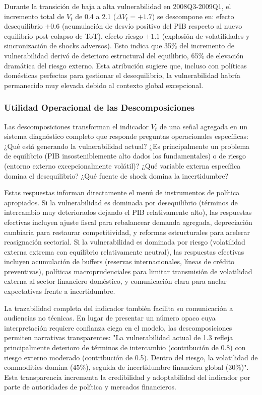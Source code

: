 \documentclass[3p,11pt,draft,natbib=false]{elsarticle}
\begin{document}
Durante la transición de baja a alta vulnerabilidad en 2008Q3-2009Q1, el incremento total de $V_t$ de 0.4 a 2.1 ($\Delta V_t = +1.7$) se descompone en: efecto desequilibrio $+0.6$ (acumulación de desvío positivo del PIB respecto al nuevo equilibrio post-colapso de ToT), efecto riesgo $+1.1$ (explosión de volatilidades y sincronización de shocks adversos). Esto indica que 35\% del incremento de vulnerabilidad derivó de deterioro estructural del equilibrio, 65\% de elevación dramática del riesgo externo. Esta atribución sugiere que, incluso con políticas domésticas perfectas para gestionar el desequilibrio, la vulnerabilidad habría permanecido muy elevada debido al contexto global excepcional.

\subsubsection{Utilidad Operacional de las Descomposiciones}

Las descomposiciones transforman el indicador $V_t$ de una señal agregada en un sistema diagnóstico completo que responde preguntas operacionales específicas: ¿Qué está generando la vulnerabilidad actual? ¿Es principalmente un problema de equilibrio (PIB insosteniblemente alto dados los fundamentales) o de riesgo (entorno externo excepcionalmente volátil)? ¿Qué variable externa específica domina el desequilibrio? ¿Qué fuente de shock domina la incertidumbre?

Estas respuestas informan directamente el menú de instrumentos de política apropiados. Si la vulnerabilidad es dominada por desequilibrio (términos de intercambio muy deteriorados dejando el PIB relativamente alto), las respuestas efectivas incluyen ajuste fiscal para rebalancear demanda agregada, depreciación cambiaria para restaurar competitividad, y reformas estructurales para acelerar reasignación sectorial. Si la vulnerabilidad es dominada por riesgo (volatilidad externa extrema con equilibrio relativamente neutral), las respuestas efectivas incluyen acumulación de buffers (reservas internacionales, líneas de crédito preventivas), políticas macroprudenciales para limitar transmisión de volatilidad externa al sector financiero doméstico, y comunicación clara para anclar expectativas frente a incertidumbre.

La trazabilidad completa del indicador también facilita su comunicación a audiencias no técnicas. En lugar de presentar un número opaco cuya interpretación requiere confianza ciega en el modelo, las descomposiciones permiten narrativas transparentes: "La vulnerabilidad actual de 1.3 refleja principalmente deterioro de términos de intercambio (contribución de 0.8) con riesgo externo moderado (contribución de 0.5). Dentro del riesgo, la volatilidad de commodities domina (45\%), seguida de incertidumbre financiera global (30\%)". Esta transparencia incrementa la credibilidad y adoptabilidad del indicador por parte de autoridades de política y mercados financieros.
\end{document}
